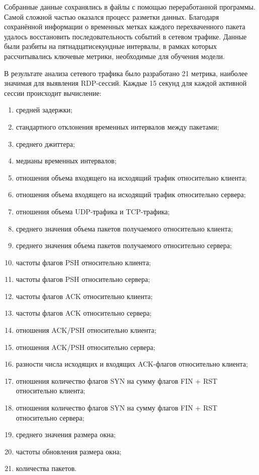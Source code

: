 \documentclass[bachelor, och, coursework]{SCWorks}
\begin{document}
Собранные данные сохранялись в файлы с помощью переработанной программы. Самой сложной частью оказался процесс разметки данных. Благодаря сохранённой 
информации о временных метках каждого перехваченного пакета удалось восстановить последовательность событий в сетевом трафике. Данные были разбиты на 
пятнадцатисекундные интервалы, в рамках которых рассчитывались ключевые метрики, необходимые для обучения модели.  

В результате анализа сетевого трафика было разработано 21 метрика, наиболее значимая для выявления RDP-сессий. Каждые 15 секунд для каждой активной сессии 
происходит вычисление:  

\begin{enumerate}
  \item средней задержки;
  \item стандартного отклонения временных интервалов между пакетами;
  \item среднего джиттера;
  \item медианы временных интервалов;
  \item отношения объема входящего на исходящий трафик относительно клиента;
  \item отношения объема входящего на исходящий трафик относительно сервера;
  \item отношения объема UDP-трафика и TCP-трафика;
  \item среднего значения объема пакетов получаемого относительно клиента;
  \item среднего значения объема пакетов получаемого относительно сервера;
  \item частоты флагов PSH относительно клиента;
  \item частоты флагов PSH относительно сервера;
  \item частоты флагов ACK относительно клиента;
  \item частоты флагов ACK относительно сервера;
  \item отношения ACK/PSH относительно клиента;
  \item отношения ACK/PSH относительно сервера;
  \item разности числа исходящих и входящих ACK-флагов относительно клиента;
  \item отношения количество флагов SYN на сумму флагов FIN + RST относительно клиента;
  \item отношения количество флагов SYN на сумму флагов FIN + RST относительно сервера;
  \item среднего значения размера окна;
  \item частоты обновления размера окна;
  \item количества пакетов.
\end{enumerate}
\end{document}
